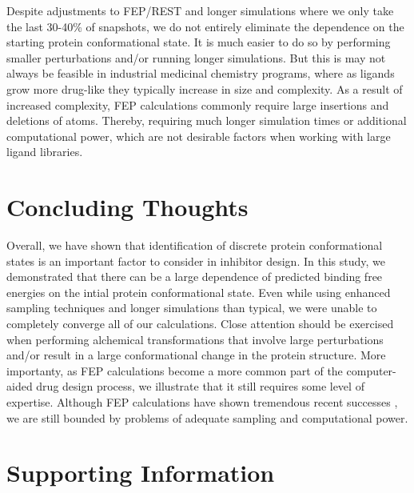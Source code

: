 \documentclass{article}
\begin{document}
Despite adjustments to FEP/REST and longer simulations where we only take the last 30-40\% of snapshots, we do not entirely eliminate the dependence on the starting protein conformational state.
It is much easier to do so by performing smaller perturbations and/or running longer simulations. %
But this is may not always be feasible in industrial medicinal chemistry programs, where as ligands grow more drug-like they typically increase in size and complexity.
As a result of increased complexity, FEP calculations commonly require large insertions and deletions of atoms.
Thereby, requiring much longer simulation times or additional computational power, which are not desirable factors when working with large ligand libraries. %

\section{Concluding Thoughts}
Overall, we have shown that identification of discrete protein conformational states is an important factor to consider in inhibitor design.
In this study, we demonstrated that there can be a large dependence of predicted binding free energies on the intial protein conformational state.
Even while using enhanced sampling techniques and longer simulations than typical, we were unable to completely converge all of our calculations.
Close attention should be exercised when performing alchemical transformations that involve large perturbations and/or result in a large conformational change in the protein structure.
More importanty, as FEP calculations become a more common part of the computer-aided drug design process, we illustrate that it still requires some level of expertise.
Although FEP calculations have shown tremendous recent successes \cite{FEPplus}, we are still bounded by problems of adequate sampling and computational power.

\pagebreak
\section{Supporting Information}
\end{document}

